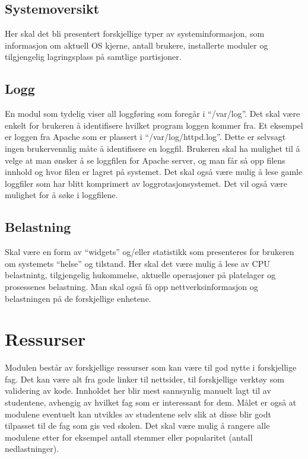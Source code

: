 \subsection{Systemoversikt}
Her skal det bli presentert forskjellige typer av systeminformasjon, som informasjon om aktuell OS kjerne, antall brukere, installerte moduler og tilgjengelig lagringsplass på samtlige partisjoner. 

\subsection{Logg}
En modul som tydelig viser all loggføring som foregår i “/var/log”. Det skal være enkelt for brukeren å identifisere hvilket program loggen kommer fra. Et eksempel er loggen fra Apache som er plassert i “/var/log/httpd.log”. Dette er selvsagt ingen brukervennlig måte å identifisere en loggfil. Brukeren skal ha mulighet til å velge at man ønsker å se loggfilen for Apache server, og man får så opp filens innhold og hvor filen er lagret på systemet. Det skal også være mulig å lese gamle loggfiler som har blitt komprimert av loggrotasjonsystemet. Det vil også være mulighet for å søke i loggfilene.

\subsection{Belastning}
Skal være en form av “widgets” og/eller statistikk som presenteres for brukeren om systemets “helse” og tilstand. Her skal det være mulig å lese av CPU belastnintg, tilgjengelig hukommelse, aktuelle operasjoner på platelager og prosessenes belastning. Man skal også få opp nettverksinformasjon og belastningen på de forskjellige enhetene.



\section{Ressurser}
Modulen består av forskjellige ressurser som kan være til god nytte i forskjellige fag. Det kan være alt fra gode linker til nettsider, til forskjellige verktøy som validering av kode. Innholdet her blir mest sannsynlig manuelt lagt til av studentene, avhengig av hvilket fag som er interessant for dem. Målet er også at modulene eventuelt kan utvikles av studentene selv slik at disse blir godt tilpasset til de fag som gis ved skolen. Det skal være mulig å rangere alle modulene etter for eksempel antall stemmer eller popularitet (antall nedlastninger).

